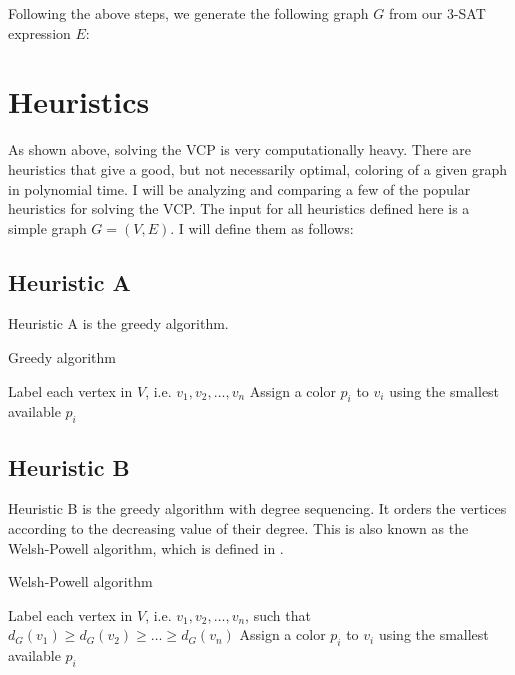 \documentclass{article}
\theoremstyle{definition}
\begin{document}
Following the above steps, we generate the following graph \(G\) from our 3-SAT expression \(E\):






\section*{Heuristics}
As shown above, solving the VCP is very computationally heavy. There are heuristics that give a good, but not necessarily optimal, coloring of a given graph in polynomial time. I will be analyzing and comparing a few of the popular heuristics for solving the VCP. The input for all heuristics defined here is a simple graph \(G = (V, E)\). I will define them as follows:

\subsection*{Heuristic A}

Heuristic A is the greedy algorithm.

\begin{algorithm}
\caption{Greedy algorithm}
\begin{algorithmic}[1]
\State Label each vertex in $V$, i.e. $v_1, v_2, \dots, v_n$
\State Assign a color $p_i$ to $v_i$ using the smallest available $p_i$
\EndFor
\end{algorithmic}
\end{algorithm}

\subsection*{Heuristic B}

Heuristic B is the greedy algorithm with degree sequencing. It orders the vertices according to the decreasing value of their degree. This is also known as the Welsh-Powell algorithm, which is defined in \cite{welsh}.

\begin{algorithm}
\caption{Welsh-Powell algorithm}
\begin{algorithmic}[1]
\State Label each vertex in $V$, i.e. $v_1, v_2, \dots, v_n$, such that $d_G(v_1) \geq d_G(v_2) \geq \dots \geq d_G(v_n)$
\State Assign a color $p_i$ to $v_i$ using the smallest available $p_i$
\EndFor
\end{algorithmic}
\end{algorithm}
\end{document}
